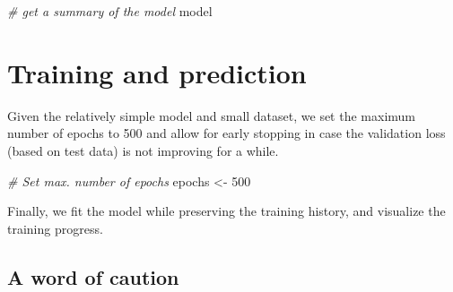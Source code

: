\documentclass[
  12pt,
]{style/krantz}
\newenvironment{Shaded}{\begin{snugshade}}{\end{snugshade}}
\newcommand{\AttributeTok}[1]{\textcolor[rgb]{0.77,0.63,0.00}{#1}}
\newcommand{\CommentTok}[1]{\textcolor[rgb]{0.56,0.35,0.01}{\textit{#1}}}
\newcommand{\DecValTok}[1]{\textcolor[rgb]{0.00,0.00,0.81}{#1}}
\newcommand{\FloatTok}[1]{\textcolor[rgb]{0.00,0.00,0.81}{#1}}
\newcommand{\FunctionTok}[1]{\textcolor[rgb]{0.00,0.00,0.00}{#1}}
\newcommand{\NormalTok}[1]{#1}
\newcommand{\OtherTok}[1]{\textcolor[rgb]{0.56,0.35,0.01}{#1}}
\newcommand{\SpecialCharTok}[1]{\textcolor[rgb]{0.00,0.00,0.00}{#1}}
\begin{document}
\begin{Shaded}
\begin{Highlighting}[]
\CommentTok{\# get a summary of the model}
\NormalTok{model}
\end{Highlighting}
\end{Shaded}

\hypertarget{training-and-prediction}{%
\section{Training and prediction}\label{training-and-prediction}}

Given the relatively simple model and small dataset, we set the maximum number of epochs to 500 and allow for early stopping in case the validation loss (based on test data) is not improving for a while.

\begin{Shaded}
\begin{Highlighting}[]
\CommentTok{\# Set max. number of epochs}
\NormalTok{epochs }\OtherTok{\textless{}{-}} \DecValTok{500}
\end{Highlighting}
\end{Shaded}

Finally, we fit the model while preserving the training history, and visualize the training progress.

\begin{Shaded}
\end{Shaded}

\hypertarget{a-word-of-caution}{%
\subsection{A word of caution}\label{a-word-of-caution}}
\end{document}
